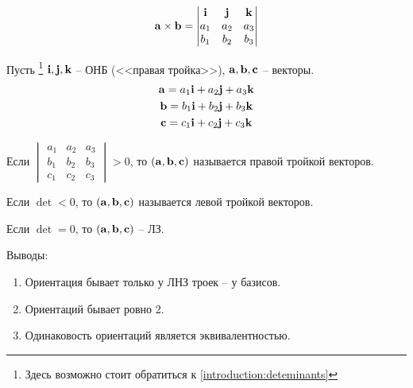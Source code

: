 \documentclass[main]{subfiles}
\begin{document}
\begin{remark}
    \[\mathbf{a} \times \mathbf{b} =
        \begin{vmatrix}
            \mathbf{i} & \mathbf{j} & \mathbf{k} \\
            a_1 & a_2 & a_3 \\
            b_1 & b_2 & b_3 \\
        \end{vmatrix}\]
\end{remark}

\begin{definition}[Ориентация]
    Пусть%
    \footnote{Здесь возможно стоит обратиться к \autoref{introduction:deteminants}}
    $\mathbf{i}, \mathbf{j}, \mathbf{k}$ -- ОНБ (<<правая тройка>>), $\mathbf{a}, \mathbf{b}, \mathbf{c}$ -- векторы.
    \begin{gather*}
        \mathbf{a} = a_1 \mathbf{i} + a_2 \mathbf{j} + a_3 \mathbf{k}\\
        \mathbf{b} = b_1 \mathbf{i} + b_2 \mathbf{j} + b_3 \mathbf{k}\\
        \mathbf{c} = c_1 \mathbf{i} + c_2 \mathbf{j} + c_3 \mathbf{k}
    \end{gather*}

    Если $\begin{vmatrix}
            a_1 & a_2 & a_3 \\
            b_1 & b_2 & b_3 \\
            c_1 & c_2 & c_3
        \end{vmatrix} > 0$, то $(\mathbf{a}, \mathbf{b}, \mathbf{c})$ называется правой тройкой векторов.

    Если $\det < 0$, то $(\mathbf{a}, \mathbf{b}, \mathbf{c})$ называется левой тройкой векторов.

    Если $\det = 0$, то $(\mathbf{a}, \mathbf{b}, \mathbf{c})$ -- ЛЗ.
\end{definition}

Выводы:
\begin{enumerate}
    \item Ориентация бывает только у ЛНЗ троек -- у базисов.
    \item Ориентаций бывает ровно 2.
    \item Одинаковость ориентаций является эквивалентностью.
\end{enumerate}
\end{document}
